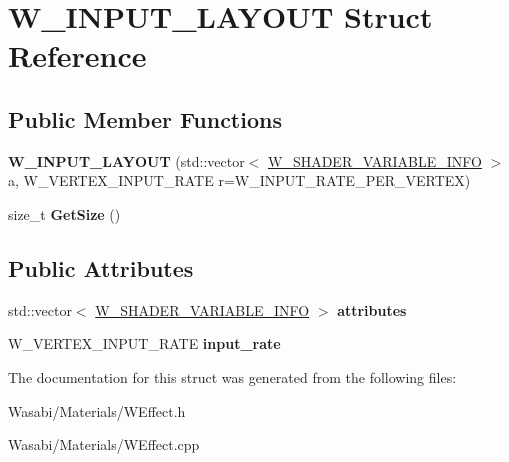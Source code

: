 \hypertarget{struct_w___i_n_p_u_t___l_a_y_o_u_t}{}\section{W\+\_\+\+I\+N\+P\+U\+T\+\_\+\+L\+A\+Y\+O\+UT Struct Reference}
\label{struct_w___i_n_p_u_t___l_a_y_o_u_t}
\subsection*{Public Member Functions}
\begin{DoxyCompactItemize}
\item 
{\bfseries W\+\_\+\+I\+N\+P\+U\+T\+\_\+\+L\+A\+Y\+O\+UT} (std\+::vector$<$ \hyperlink{struct_w___s_h_a_d_e_r___v_a_r_i_a_b_l_e___i_n_f_o}{W\+\_\+\+S\+H\+A\+D\+E\+R\+\_\+\+V\+A\+R\+I\+A\+B\+L\+E\+\_\+\+I\+N\+FO} $>$ a, W\+\_\+\+V\+E\+R\+T\+E\+X\+\_\+\+I\+N\+P\+U\+T\+\_\+\+R\+A\+TE r=W\+\_\+\+I\+N\+P\+U\+T\+\_\+\+R\+A\+T\+E\+\_\+\+P\+E\+R\+\_\+\+V\+E\+R\+T\+EX)\hypertarget{struct_w___i_n_p_u_t___l_a_y_o_u_t_a7170e52b6b28b27eb67e0a2d790b6cf2}{}\label{struct_w___i_n_p_u_t___l_a_y_o_u_t_a7170e52b6b28b27eb67e0a2d790b6cf2}

\item 
size\+\_\+t {\bfseries Get\+Size} ()\hypertarget{struct_w___i_n_p_u_t___l_a_y_o_u_t_ad2f73e39a5198e328903616f627b313f}{}\label{struct_w___i_n_p_u_t___l_a_y_o_u_t_ad2f73e39a5198e328903616f627b313f}

\end{DoxyCompactItemize}
\subsection*{Public Attributes}
\begin{DoxyCompactItemize}
\item 
std\+::vector$<$ \hyperlink{struct_w___s_h_a_d_e_r___v_a_r_i_a_b_l_e___i_n_f_o}{W\+\_\+\+S\+H\+A\+D\+E\+R\+\_\+\+V\+A\+R\+I\+A\+B\+L\+E\+\_\+\+I\+N\+FO} $>$ {\bfseries attributes}\hypertarget{struct_w___i_n_p_u_t___l_a_y_o_u_t_aab71e215609c4b3a7c23e87fffdcb65e}{}\label{struct_w___i_n_p_u_t___l_a_y_o_u_t_aab71e215609c4b3a7c23e87fffdcb65e}

\item 
W\+\_\+\+V\+E\+R\+T\+E\+X\+\_\+\+I\+N\+P\+U\+T\+\_\+\+R\+A\+TE {\bfseries input\+\_\+rate}\hypertarget{struct_w___i_n_p_u_t___l_a_y_o_u_t_aa02f513ac0db3cbb549d4f5a48bb9fef}{}\label{struct_w___i_n_p_u_t___l_a_y_o_u_t_aa02f513ac0db3cbb549d4f5a48bb9fef}

\end{DoxyCompactItemize}


The documentation for this struct was generated from the following files\+:\begin{DoxyCompactItemize}
\item 
Wasabi/\+Materials/W\+Effect.\+h\item 
Wasabi/\+Materials/W\+Effect.\+cpp\end{DoxyCompactItemize}
